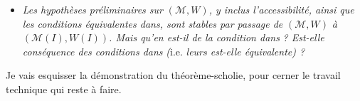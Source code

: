 \begin{itemize}[leftmargin=2.5em]

\item[\circled{4}] \textit{Les hypothèses préliminaires sur} $(\mathcal{M}, W)$\textit{, y inclus l'accessibilité, ainsi que les conditions équivalentes dans}\textit{, sont stables par passage de} $(\mathcal{M}, W)$ \textit{à} $(\mathcal{M}(I), W(I))$\textit{. Mais qu'en est-il de la condition dans} \textit{? Est-elle conséquence des conditions dans}  \textit{(}i.e. \textit{leurs est-elle équivalente) ?} %
\end{itemize}

Je vais esquisser la démonstration du théorème-scholie, pour cerner le travail technique qui reste à faire.

